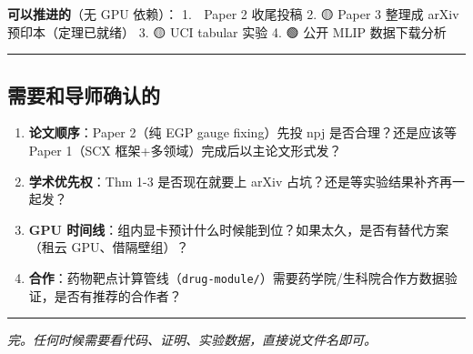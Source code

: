 \documentclass[
  12pt,
]{ctexart}
\providecommand{\tightlist}{%
  \setlength{\itemsep}{0pt}\setlength{\parskip}{0pt}}
\begin{document}
\textbf{可以推进的}（无 GPU 依赖）： 1. 🔴 Paper 2 收尾投稿 2. 🟡 Paper
3 整理成 arXiv 预印本（定理已就绪） 3. 🟡 UCI tabular 实验 4. 🟢 公开
MLIP 数据下载分析

\begin{center}\rule{0.5\linewidth}{0.5pt}\end{center}

\subsection{需要和导师确认的}\label{ux9700ux8981ux548cux5bfcux5e08ux786eux8ba4ux7684}

\begin{enumerate}
\def\labelenumi{\arabic{enumi}.}
\tightlist
\item
  \textbf{论文顺序}：Paper 2（纯 EGP gauge fixing）先投 npj
  是否合理？还是应该等 Paper 1（SCX 框架+多领域）完成后以主论文形式发？
\item
  \textbf{学术优先权}：Thm 1-3 是否现在就要上 arXiv
  占坑？还是等实验结果补齐再一起发？
\item
  \textbf{GPU
  时间线}：组内显卡预计什么时候能到位？如果太久，是否有替代方案（租云
  GPU、借隔壁组）？
\item
  \textbf{合作}：药物靶点计算管线（\texttt{drug-module/}）需要药学院/生科院合作方数据验证，是否有推荐的合作者？
\end{enumerate}

\begin{center}\rule{0.5\linewidth}{0.5pt}\end{center}

\emph{完。任何时候需要看代码、证明、实验数据，直接说文件名即可。}
\end{document}
